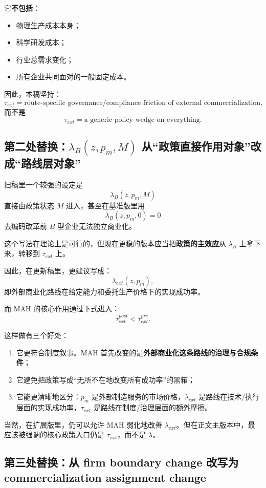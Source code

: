 \documentclass[12pt,fontset=none]{ctexart}
\begin{document}
它\textbf{不包括}：
\begin{itemize}
    \item 物理生产成本本身；
    \item 科学研发成本；
    \item 行业总需求变化；
    \item 所有企业共同面对的一般固定成本。
\end{itemize}

因此，本稿坚持：
\[
\tau_{ext}=\text{route-specific governance/compliance friction of external commercialization},
\]
而不是
\[
\tau_{ext}=\text{a generic policy wedge on everything.}
\]

\subsection{第二处替换：\texorpdfstring{$\lambda_B(z,p_m,M)$}{lambdaB(z, pm, M)} 从“政策直接作用对象”改成“路线层对象”}

旧稿里一个较强的设定是
\[
\lambda_B(z,p_m,M)
\]
直接由政策状态 $M$ 进入，甚至在基准版里用
\[
\lambda_B(z,p_m,0)=0
\]
去编码改革前 $B$ 型企业无法独立商业化。

这个写法在理论上是可行的，但现在更稳的版本应当把\textbf{政策的主效应}从 $\lambda_B$ 上拿下来，转移到 $\tau_{ext}$ 上。

因此，在更新稿里，更建议写成：
\[
\lambda_{ext}(z,p_m),
\]
即外部商业化路线在给定能力和委托生产价格下的实现成功率。

而 MAH 的核心作用通过下式进入：
\[
\tau_{ext}^{post}<\tau_{ext}^{pre}.
\]

这样做有三个好处：
\begin{enumerate}
    \item 它更符合制度叙事。MAH 首先改变的是\textbf{外部商业化这条路线的治理与合规条件}；
    \item 它避免把政策写成“无所不在地改变所有成功率”的黑箱；
    \item 它能更清晰地区分：$p_m$ 是外部制造服务的市场价格，$\lambda_{ext}$ 是路线在技术/执行层面的实现成功率，$\tau_{ext}$ 是路线在制度/治理层面的额外摩擦。
\end{enumerate}

当然，在扩展版里，仍可以允许 MAH 弱化地改善 $\lambda_{ext}$。但在正文主版本中，最应该被强调的核心政策入口仍是 $\tau_{ext}$，而不是 $\lambda$。

\subsection{第三处替换：从 firm boundary change 改写为 commercialization assignment change}
\end{document}
